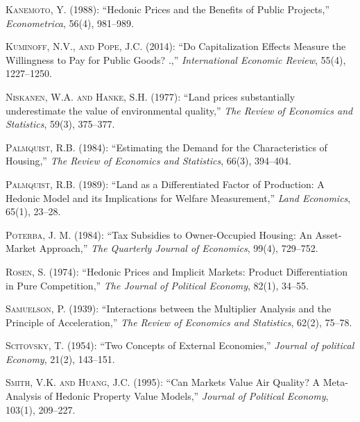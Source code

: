\documentclass[ecta,nameyear,draft]{econsocart}
\theoremstyle{plain}
\theoremstyle{remark}
\begin{document}
\begin{thebibliography}{}
\textsc{Kanemoto, Y.} (1988):
``Hedonic Prices and the Benefits of Public Projects,''
\textit{Econometrica}, 56(4), 981--989.
\endbibitem

\textsc{Kuminoff, N.V., and Pope, J.C.} (2014):
``Do Capitalization Effects Measure the Willingness to Pay for Public Goods?  .,''
\textit{International Economic Review}, 55(4), 1227--1250.
\endbibitem

\textsc{Niskanen, W.A. and Hanke, S.H.} (1977):
``Land prices substantially underestimate the value of environmental quality,''
\textit{The Review of Economics and Statistics}, 59(3), 375--377.
\endbibitem

\textsc{Palmquist, R.B.} (1984):
``Estimating the Demand for the Characteristics of Housing,''
\textit{The Review of Economics and Statistics}, 66(3), 394--404.
\endbibitem


\textsc{Palmquist, R.B.} (1989):
``Land as a Differentiated Factor of Production: A Hedonic Model and its Implications for Welfare Measurement,''
\textit{Land Economics}, 65(1), 23--28.
\endbibitem

\textsc{Poterba, J. M.} (1984):
``Tax Subsidies to Owner-Occupied Housing: An Asset-Market Approach,''
\textit{The Quarterly Journal of Economics}, 99(4), 729--752.
\endbibitem

\textsc{Rosen, S.} (1974):
``Hedonic Prices and Implicit Markets: Product Differentiation in Pure Competition,''
\textit{The Journal of Political Economy}, 82(1), 34--55.
\endbibitem

\textsc{Samuelson, P.} (1939):
``Interactions between the Multiplier Analysis and the Principle of Acceleration,''
\textit{The Review of Economics and Statistics}, 62(2), 75--78.
\endbibitem

\textsc{Scitovsky, T.} (1954):
``Two Concepts of External Economies,''
\textit{Journal of political Economy}, 21(2), 143--151.
\endbibitem


\textsc{Smith, V.K. and Huang, J.C.} (1995):
``Can Markets Value Air Quality? A Meta-Analysis of Hedonic Property Value Models,''
\textit{Journal of Political Economy}, 103(1), 209--227.
\endbibitem



\end{thebibliography}
\end{document}
